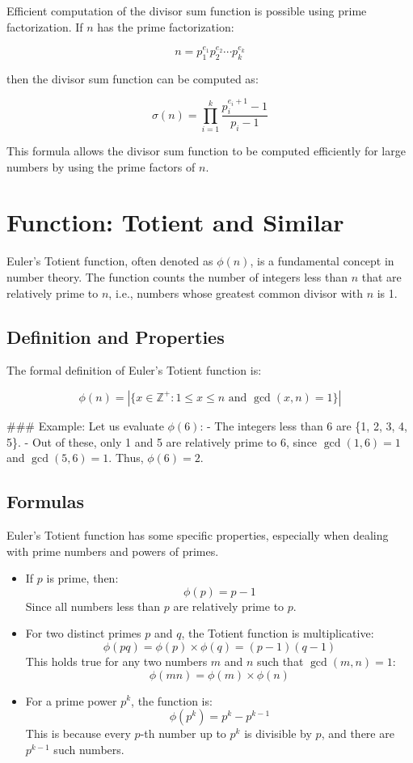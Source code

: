 \documentclass[10pt,a4paper]{article}
\begin{document}
Efficient computation of the divisor sum function is possible using prime factorization. If \(n\) has the prime factorization:

\[
n = p_1^{e_1} p_2^{e_2} \cdots p_k^{e_k}
\]

then the divisor sum function can be computed as:

\[
\sigma(n) = \prod_{i=1}^{k} \frac{p_i^{e_i + 1} - 1}{p_i - 1}
\]

This formula allows the divisor sum function to be computed efficiently for large numbers by using the prime factors of \(n\).



\section*{Function: Totient and Similar}

Euler’s Totient function, often denoted as \(\phi(n)\), is a fundamental concept in number theory. The function counts the number of integers less than \(n\) that are relatively prime to \(n\), i.e., numbers whose greatest common divisor with \(n\) is 1. 

\subsection*{Definition and Properties}

The formal definition of Euler’s Totient function is:

\[
\phi(n) = |\{x \in \mathbb{Z}^+ : 1 \leq x \leq n \text{ and } \gcd(x, n) = 1 \}|
\]

### Example: 
Let us evaluate \(\phi(6)\):
- The integers less than 6 are \{1, 2, 3, 4, 5\}.
- Out of these, only 1 and 5 are relatively prime to 6, since \(\gcd(1, 6) = 1\) and \(\gcd(5, 6) = 1\).
Thus, \(\phi(6) = 2\).

\subsection*{Formulas}

Euler's Totient function has some specific properties, especially when dealing with prime numbers and powers of primes.

\begin{itemize}
    \item If \(p\) is prime, then:
    \[
    \phi(p) = p - 1
    \]
    Since all numbers less than \(p\) are relatively prime to \(p\).

    \item For two distinct primes \(p\) and \(q\), the Totient function is multiplicative:
    \[
    \phi(pq) = \phi(p) \times \phi(q) = (p-1)(q-1)
    \]
    This holds true for any two numbers \(m\) and \(n\) such that \(\gcd(m, n) = 1\):
    \[
    \phi(mn) = \phi(m) \times \phi(n)
    \]
    \item For a prime power \(p^k\), the function is:
    \[
    \phi(p^k) = p^k - p^{k-1}
    \]
    This is because every \(p\)-th number up to \(p^k\) is divisible by \(p\), and there are \(p^{k-1}\) such numbers.
\end{itemize}
\end{document}
